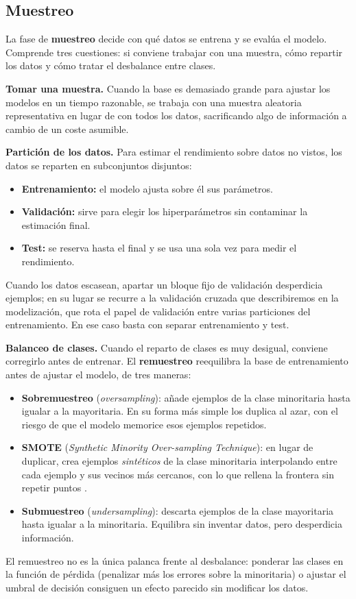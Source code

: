 \documentclass[12pt,a4paper]{report}
\theoremstyle{definition}
\begin{document}
\subsection{Muestreo}

La fase de \textbf{muestreo} decide con qué datos se entrena y se evalúa el modelo. Comprende tres
cuestiones: si conviene trabajar con una muestra, cómo repartir los datos y cómo tratar el desbalance
entre clases.

\medskip
\noindent\textbf{Tomar una muestra.} Cuando la base es demasiado grande para ajustar los modelos en un
tiempo razonable, se trabaja con una muestra aleatoria representativa en lugar de con todos los datos,
sacrificando algo de información a cambio de un coste asumible.

\medskip
\noindent\textbf{Partición de los datos.} Para estimar el rendimiento sobre datos no vistos, los datos
se reparten en subconjuntos disjuntos:
\begin{itemize}
\item \textbf{Entrenamiento:} el modelo ajusta sobre él sus parámetros.
\item \textbf{Validación:} sirve para elegir los hiperparámetros sin contaminar la estimación final.
\item \textbf{Test:} se reserva hasta el final y se usa una sola vez para medir el rendimiento.
\end{itemize}
Cuando los datos escasean, apartar un bloque fijo de validación desperdicia ejemplos; en su lugar se
recurre a la validación cruzada que describiremos en la modelización, que rota el papel de validación
entre varias particiones del entrenamiento. En ese caso basta con separar entrenamiento y test.

\medskip
\noindent\textbf{Balanceo de clases.} Cuando el reparto de clases es muy desigual, conviene corregirlo
antes de entrenar. El \textbf{remuestreo} reequilibra la base de entrenamiento antes de ajustar el
modelo, de tres maneras:
\begin{itemize}
\item \textbf{Sobremuestreo} (\emph{oversampling}): añade ejemplos de la clase minoritaria hasta
igualar a la mayoritaria. En su forma más simple los duplica al azar, con el riesgo de que el modelo
memorice esos ejemplos repetidos.
\item \textbf{SMOTE} (\emph{Synthetic Minority Over-sampling Technique}): en lugar de duplicar, crea
ejemplos \emph{sintéticos} de la clase minoritaria interpolando entre cada ejemplo y sus vecinos más
cercanos, con lo que rellena la frontera sin repetir puntos \cite{chawla2002smote}.
\item \textbf{Submuestreo} (\emph{undersampling}): descarta ejemplos de la clase mayoritaria hasta
igualar a la minoritaria. Equilibra sin inventar datos, pero desperdicia información.
\end{itemize}
El remuestreo no es la única palanca frente al desbalance: ponderar las clases en la función de pérdida
(penalizar más los errores sobre la minoritaria) o ajustar el umbral de decisión consiguen un efecto
parecido sin modificar los datos.
\end{document}
